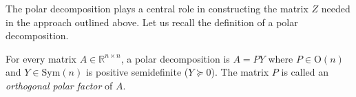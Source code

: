 \documentclass[final,onefignum,onetabnum,dvipsnames]{siamart251216}
\numberwithin{algorithm}{section}
\numberwithin{equation}{section}
\begin{document}
The polar decomposition plays a central role in constructing the matrix $Z$ needed in the approach outlined above.
Let us recall the definition of a polar decomposition.
\begin{definition} \label{def:polar}
    For every matrix $A\in\mathbb{R}^{n\times n}$, a polar decomposition is $A = PY$ where $P\in\mathrm{O}(n)$ and $Y\in\mathrm{Sym}(n)$ is positive semidefinite ($Y\succeq 0$). The matrix $P$ is called an \emph{orthogonal polar factor} of $A$.
\end{definition}

    
\end{document}
